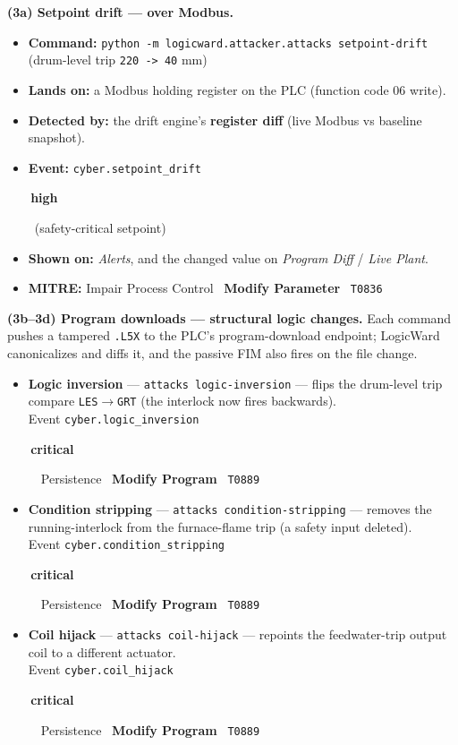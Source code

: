 \documentclass[11pt,a4paper]{article}
\newcommand{\code}[1]{\texttt{\small #1}}
\newcommand{\sev}[2]{\colorbox{#1}{\small\strut\,#2\,}}
\newcommand{\crit}{\sev{critbg}{\color{critical}\textbf{critical}}}
\newcommand{\high}{\sev{highbg}{\color{serious}\textbf{high}}}
\begin{document}
\textbf{(3a) Setpoint drift --- over Modbus.}
\begin{itemize}[leftmargin=1.3em,itemsep=1pt]
  \item \textbf{Command:} \code{python -m logicward.attacker.attacks setpoint-drift} \quad(drum-level trip \code{220 -> 40} mm)
  \item \textbf{Lands on:} a Modbus holding register on the PLC (function code 06 write).
  \item \textbf{Detected by:} the drift engine's \textbf{register diff} (live Modbus vs baseline snapshot).
  \item \textbf{Event:} \code{cyber.setpoint\_drift} \quad\high\ (safety-critical setpoint)
  \item \textbf{Shown on:} \emph{Alerts}, and the changed value on \emph{Program Diff} / \emph{Live Plant}.
  \item \textbf{MITRE:} Impair Process Control \textbullet\ \textbf{Modify Parameter} \textbullet\ \code{T0836}
\end{itemize}

\textbf{(3b--3d) Program downloads --- structural logic changes.} Each command pushes a
tampered \code{.L5X} to the PLC's program-download endpoint; LogicWard canonicalizes and
diffs it, and the passive FIM also fires on the file change.
\begin{itemize}[leftmargin=1.3em,itemsep=2pt]
  \item \textbf{Logic inversion} --- \code{attacks logic-inversion} --- flips the drum-level
        trip compare \code{LES$\rightarrow$GRT} (the interlock now fires backwards).\\
        Event \code{cyber.logic\_inversion} \crit\ \textbullet\ Persistence \textbullet\ \textbf{Modify Program} \textbullet\ \code{T0889}
  \item \textbf{Condition stripping} --- \code{attacks condition-stripping} --- removes the
        running-interlock from the furnace-flame trip (a safety input deleted).\\
        Event \code{cyber.condition\_stripping} \crit\ \textbullet\ Persistence \textbullet\ \textbf{Modify Program} \textbullet\ \code{T0889}
  \item \textbf{Coil hijack} --- \code{attacks coil-hijack} --- repoints the feedwater-trip
        output coil to a different actuator.\\
        Event \code{cyber.coil\_hijack} \crit\ \textbullet\ Persistence \textbullet\ \textbf{Modify Program} \textbullet\ \code{T0889}
\end{itemize}
\end{document}
